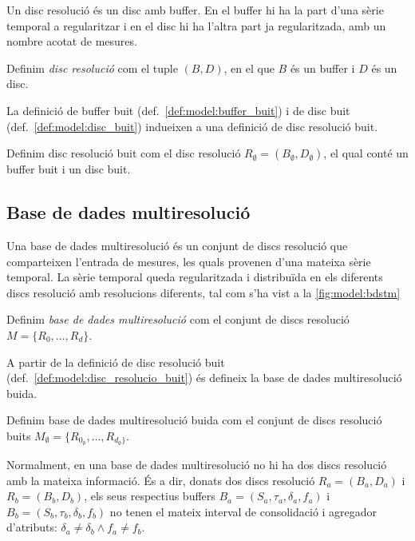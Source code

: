 Un disc resolució és un disc amb buffer. En el buffer hi ha la part d'una sèrie temporal a regularitzar i en el disc hi ha l'altra part ja regularitzada, amb un nombre acotat de mesures. 

\begin{definition}
  Definim \emph{disc resolució} com el tuple $(B,D)$, en el que $B$
  és un buffer i $D$ és un disc.
\end{definition}
 
La definició de buffer buit (def.~\ref{def:model:buffer_buit}) i de disc buit (def.~\ref{def:model:disc_buit}) indueixen a una definició de disc resolució buit. 

\begin{definition}\label{def:model:disc_resolucio_buit}
  Definim disc resolució buit com el disc resolució $R_{\emptyset}
  = (B_{\emptyset},D_{\emptyset})$, el qual conté un buffer buit i un
  disc buit.
\end{definition}




\subsection{Base de dades multiresolució}\label{sec:model:bdstm}

Una base de dades multiresolució és un conjunt de discs resolució que comparteixen l'entrada de mesures, les quals provenen d'una mateixa sèrie temporal. La sèrie temporal queda regularitzada i distribuïda  en els diferents discs resolució amb resolucions diferents, tal com s'ha vist a la \autoref{fig:model:bdstm}


\begin{definition}
  Definim \emph{base de dades multiresolució} com el conjunt de discs resolució
  $M=\{R_0,\dotsc,R_d\}$.
\end{definition}

A partir de la definició de disc resolució buit (def.~\ref{def:model:disc_resolucio_buit}) és defineix la base de dades multiresolució buida. 
 
\begin{definition}\label{def:model:bd_multiresolucio_buit}
  Definim base de dades multiresolució buida com el conjunt de discs
  resolució buits
  $M_{\emptyset}=\{R_{0_{\emptyset}},\dotsc,R_{d_{\emptyset}\}}$.
\end{definition}

Normalment, en una base de dades multiresolució no hi ha dos discs
resolució amb la mateixa informació. És a dir, donats dos discs
resolució $R_a = (B_a, D_a)$ i $R_b = (B_b, D_b)$, 
els seus respectius buffers 
$B_a=(S_a,\tau_a,\delta_a,f_a)$ i
$B_b=(S_b,\tau_b,\delta_b,f_b)$ no tenen el mateix interval de
consolidació i agregador d'atributs: 
$\delta_a \neq \delta_b \wedge f_a \neq f_b$.




